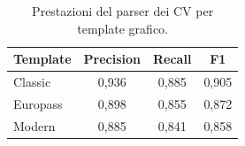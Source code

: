 \begin{table}[htbp]
  \centering
  \caption{Prestazioni del parser dei CV per template grafico.}
  \label{tab:cv-template}
  \begin{tabular}{lccc}
    \toprule
    \textbf{Template} & \textbf{Precision} & \textbf{Recall} & \textbf{F1} \\
    \midrule
    Classic  & 0,936 & 0,885 & 0,905 \\
    Europass & 0,898 & 0,855 & 0,872 \\
    Modern   & 0,885 & 0,841 & 0,858 \\
    \bottomrule
  \end{tabular}
\end{table}
